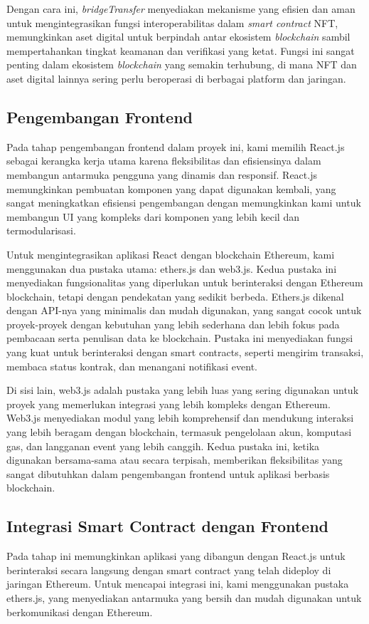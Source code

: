 Dengan cara ini, \emph{bridgeTransfer} menyediakan mekanisme yang efisien dan aman untuk mengintegrasikan fungsi interoperabilitas dalam \emph{smart contract} NFT, memungkinkan aset digital untuk berpindah antar ekosistem \emph{blockchain} sambil mempertahankan tingkat keamanan dan verifikasi yang ketat. Fungsi ini sangat penting dalam ekosistem \emph{blockchain} yang semakin terhubung, di mana NFT dan aset digital lainnya sering perlu beroperasi di berbagai platform dan jaringan.

\subsection{Pengembangan Frontend}
Pada tahap pengembangan frontend dalam proyek ini, kami memilih React.js sebagai kerangka kerja utama karena fleksibilitas dan efisiensinya dalam membangun antarmuka pengguna yang dinamis dan responsif. React.js memungkinkan pembuatan komponen yang dapat digunakan kembali, yang sangat meningkatkan efisiensi pengembangan dengan memungkinkan kami untuk membangun UI yang kompleks dari komponen yang lebih kecil dan termodularisasi.

Untuk mengintegrasikan aplikasi React dengan blockchain Ethereum, kami menggunakan dua pustaka utama: ethers.js dan web3.js. Kedua pustaka ini menyediakan fungsionalitas yang diperlukan untuk berinteraksi dengan Ethereum blockchain, tetapi dengan pendekatan yang sedikit berbeda. Ethers.js dikenal dengan API-nya yang minimalis dan mudah digunakan, yang sangat cocok untuk proyek-proyek dengan kebutuhan yang lebih sederhana dan lebih fokus pada pembacaan serta penulisan data ke blockchain. Pustaka ini menyediakan fungsi yang kuat untuk berinteraksi dengan smart contracts, seperti mengirim transaksi, membaca status kontrak, dan menangani notifikasi event.

Di sisi lain, web3.js adalah pustaka yang lebih luas yang sering digunakan untuk proyek yang memerlukan integrasi yang lebih kompleks dengan Ethereum. Web3.js menyediakan modul yang lebih komprehensif dan mendukung interaksi yang lebih beragam dengan blockchain, termasuk pengelolaan akun, komputasi gas, dan langganan event yang lebih canggih. Kedua pustaka ini, ketika digunakan bersama-sama atau secara terpisah, memberikan fleksibilitas yang sangat dibutuhkan dalam pengembangan frontend untuk aplikasi berbasis blockchain.

\subsection{Integrasi Smart Contract dengan Frontend}
Pada tahap ini memungkinkan aplikasi yang dibangun dengan React.js untuk berinteraksi secara langsung dengan smart contract yang telah dideploy di jaringan Ethereum. Untuk mencapai integrasi ini, kami menggunakan pustaka ethers.js, yang menyediakan antarmuka yang bersih dan mudah digunakan untuk berkomunikasi dengan Ethereum.

